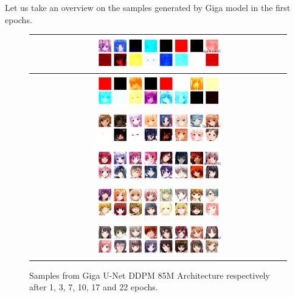 \documentclass[twocolumn,superscriptaddress,aps]{revtex4-1}
\begin{document}
Let us take an overview on the samples generated by Giga model in the first epochs.
\begin{figure}[H]
    \centering
    \begin{tabular}{c}
        \includegraphics[width=0.5\textwidth]{figures/85M_params_GIGA_DDPM_Unet_ckpt_epoch_1_epoch_1_samples.png}\\\hline
        \includegraphics[width=0.5\textwidth]{figures/85M_params_GIGA_DDPM_Unet_ckpt_epoch_3_with_16_samples.png}\\\hline
        \includegraphics[width=0.5\textwidth]{figures/85M_params_GIGA_DDPM_Unet_ckpt_epoch_7_epoch_7_samples.png}\\\hline
        \includegraphics[width=0.5\textwidth]{figures/giga_unet_ddpm_85M_ckpt_epoch_10_epoch_10_samples.png}\\\hline
        \includegraphics[width=0.5\textwidth]{figures/giga_unet_ddpm_85M_ckpt_epoch_17_with_16_samples.png}\\\hline
        \includegraphics[width=0.5\textwidth]{figures/giga_unet_ddpm_85M_ckpt_epoch_22_epoch_22_samples.png}
    \end{tabular}
    \caption{Samples from Giga U-Net DDPM 85M Architecture respectively after 1, 3, 7, 10, 17 and 22 epochs.}
    \label{fig:giga_unet_ddpm_85M_ckpt_epoch_3_epoch_3_samples}
\end{figure}
\end{document}
